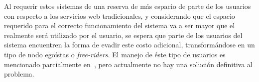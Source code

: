     Al requerir estos sistemas de una reserva de más espacio de parte
    de los usuarios con respecto a los servicios web tradicionales, y considerando
    que el espacio requerido para el correcto funcionamiento del sistema va a ser
    mayor que el realmente será utilizado por el usuario, se espera que parte de
    los usuarios del sistema encuentren la forma de evadir este costo adicional,
    transformándose en un tipo de nodo egoístas o \textit{free-riders}. El manejo de éste
    tipo de usuarios es mencionado parcialmente
    en~\cite{Altmann:2009:PFS:1719850.1719891}, pero actualmente no hay una
    solución definitiva al problema.
    
    
